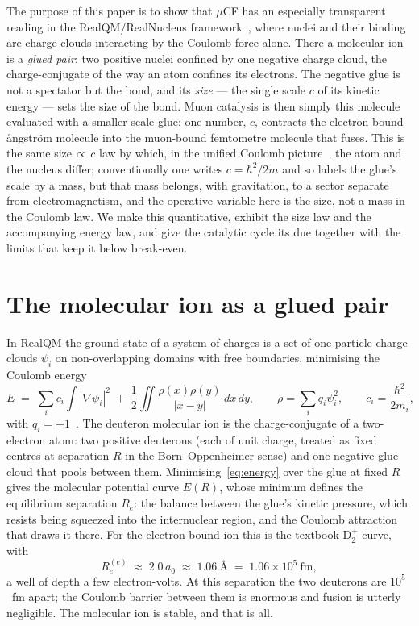 \documentclass[11pt]{article}
\begin{document}
The purpose of this paper is to show that $\mu$CF has an especially transparent reading in the
RealQM/RealNucleus framework~\cite{Johnson-RealQM,Johnson-RealNucleus}, where nuclei and their binding
are charge clouds interacting by the Coulomb force alone. There a molecular ion is a \emph{glued pair}:
two positive nuclei confined by one negative charge cloud, the charge-conjugate of the way an atom
confines its electrons. The negative glue is not a spectator but the bond, and its
\emph{size} --- the single scale $c$ of its kinetic energy --- sets the size of the bond. Muon catalysis
is then simply this molecule evaluated with a smaller-scale glue: one number, $c$, contracts the
electron-bound {\aa}ngstr\"om molecule into the muon-bound femtometre molecule that fuses. This is the
same size$\,\propto\,c$ law by which, in the unified Coulomb picture~\cite{Johnson-Unified}, the atom
and the nucleus differ; conventionally one writes $c=\hbar^2/2m$ and so labels the glue's scale by a
mass, but that mass belongs, with gravitation, to a sector separate from electromagnetism, and the
operative variable here is the size, not a mass in the Coulomb law. We make this quantitative, exhibit
the size law and the accompanying energy law, and give the catalytic cycle its due together with the
limits that keep it below break-even.

\section{The molecular ion as a glued pair}

In RealQM the ground state of a system of charges is a set of one-particle charge clouds $\psi_i$ on
non-overlapping domains with free boundaries, minimising the Coulomb energy
\begin{equation}
E \;=\; \sum_i c_i\!\int|\nabla\psi_i|^2
\;+\; \frac12\!\iint\frac{\rho(x)\rho(y)}{|x-y|}\,dx\,dy,
\qquad \rho=\sum_i q_i\psi_i^2, \qquad c_i=\frac{\hbar^2}{2m_i},
\label{eq:energy}
\end{equation}
with $q_i=\pm1$~\cite{Johnson-RealQM,Johnson-RealNucleus}. The deuteron molecular ion is the
charge-conjugate of a two-electron atom: two positive deuterons (each of unit charge, treated as fixed
centres at separation $R$ in the Born--Oppenheimer sense) and one negative glue cloud that pools between
them. Minimising~\eqref{eq:energy} over the glue at fixed $R$ gives the molecular potential curve
$E(R)$, whose minimum defines the equilibrium separation $R_e$: the balance between the glue's kinetic
pressure, which resists being squeezed into the internuclear region, and the Coulomb attraction that
draws it there. For the electron-bound ion this is the textbook $\mathrm{D}_2^{+}$ curve, with
\begin{equation}
R_e^{(e)} \;\approx\; 2.0\,a_0 \;\approx\; 1.06~\text{\AA} \;=\; 1.06\times10^{5}~\text{fm},
\end{equation}
a well of depth a few electron-volts. At this separation the two deuterons are $10^5$~fm apart; the
Coulomb barrier between them is enormous and fusion is utterly negligible. The molecular ion is stable,
and that is all.
\end{document}
